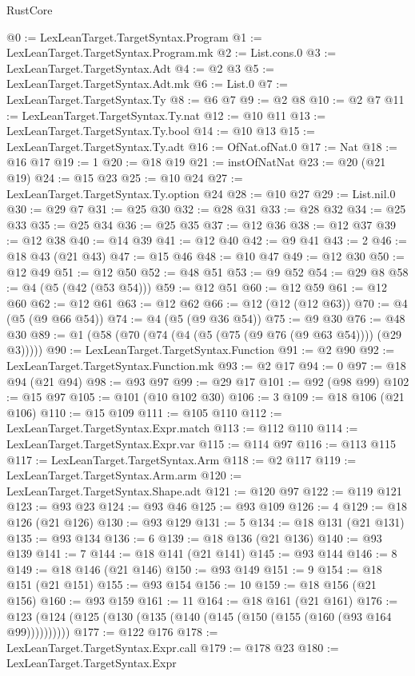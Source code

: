 \begin{lexlean}{RustCore}
\begin{coremodule}
@0 := LexLeanTarget.TargetSyntax.Program
@1 := LexLeanTarget.TargetSyntax.Program.mk
@2 := List.cons.{0}
@3 := LexLeanTarget.TargetSyntax.Adt
@4 := @2 @3
@5 := LexLeanTarget.TargetSyntax.Adt.mk
@6 := List.{0}
@7 := LexLeanTarget.TargetSyntax.Ty
@8 := @6 @7
@9 := @2 @8
@10 := @2 @7
@11 := LexLeanTarget.TargetSyntax.Ty.nat
@12 := @10 @11
@13 := LexLeanTarget.TargetSyntax.Ty.bool
@14 := @10 @13
@15 := LexLeanTarget.TargetSyntax.Ty.adt
@16 := OfNat.ofNat.{0}
@17 := Nat
@18 := @16 @17
@19 := 1
@20 := @18 @19
@21 := instOfNatNat
@23 := @20 (@21 @19)
@24 := @15 @23
@25 := @10 @24
@27 := LexLeanTarget.TargetSyntax.Ty.option @24
@28 := @10 @27
@29 := List.nil.{0}
@30 := @29 @7
@31 := @25 @30
@32 := @28 @31
@33 := @28 @32
@34 := @25 @33
@35 := @25 @34
@36 := @25 @35
@37 := @12 @36
@38 := @12 @37
@39 := @12 @38
@40 := @14 @39
@41 := @12 @40
@42 := @9 @41
@43 := 2
@46 := @18 @43 (@21 @43)
@47 := @15 @46
@48 := @10 @47
@49 := @12 @30
@50 := @12 @49
@51 := @12 @50
@52 := @48 @51
@53 := @9 @52
@54 := @29 @8
@58 := @4 (@5 (@42 (@53 @54)))
@59 := @12 @51
@60 := @12 @59
@61 := @12 @60
@62 := @12 @61
@63 := @12 @62
@66 := @12 (@12 (@12 @63))
@70 := @4 (@5 (@9 @66 @54))
@74 := @4 (@5 (@9 @36 @54))
@75 := @9 @30
@76 := @48 @30
@89 := @1 (@58 (@70 (@74 (@4 (@5 (@75 (@9 @76 (@9 @63 @54)))) (@29 @3)))))
@90 := LexLeanTarget.TargetSyntax.Function
@91 := @2 @90
@92 := LexLeanTarget.TargetSyntax.Function.mk
@93 := @2 @17
@94 := 0
@97 := @18 @94 (@21 @94)
@98 := @93 @97
@99 := @29 @17
@101 := @92 (@98 @99)
@102 := @15 @97
@105 := @101 (@10 @102 @30)
@106 := 3
@109 := @18 @106 (@21 @106)
@110 := @15 @109
@111 := @105 @110
@112 := LexLeanTarget.TargetSyntax.Expr.match
@113 := @112 @110
@114 := LexLeanTarget.TargetSyntax.Expr.var
@115 := @114 @97
@116 := @113 @115
@117 := LexLeanTarget.TargetSyntax.Arm
@118 := @2 @117
@119 := LexLeanTarget.TargetSyntax.Arm.arm
@120 := LexLeanTarget.TargetSyntax.Shape.adt
@121 := @120 @97
@122 := @119 @121
@123 := @93 @23
@124 := @93 @46
@125 := @93 @109
@126 := 4
@129 := @18 @126 (@21 @126)
@130 := @93 @129
@131 := 5
@134 := @18 @131 (@21 @131)
@135 := @93 @134
@136 := 6
@139 := @18 @136 (@21 @136)
@140 := @93 @139
@141 := 7
@144 := @18 @141 (@21 @141)
@145 := @93 @144
@146 := 8
@149 := @18 @146 (@21 @146)
@150 := @93 @149
@151 := 9
@154 := @18 @151 (@21 @151)
@155 := @93 @154
@156 := 10
@159 := @18 @156 (@21 @156)
@160 := @93 @159
@161 := 11
@164 := @18 @161 (@21 @161)
@176 := @123 (@124 (@125 (@130 (@135 (@140 (@145 (@150 (@155 (@160 (@93 @164 @99))))))))))
@177 := @122 @176
@178 := LexLeanTarget.TargetSyntax.Expr.call
@179 := @178 @23
@180 := LexLeanTarget.TargetSyntax.Expr

\end{coremodule}
\end{lexlean}
